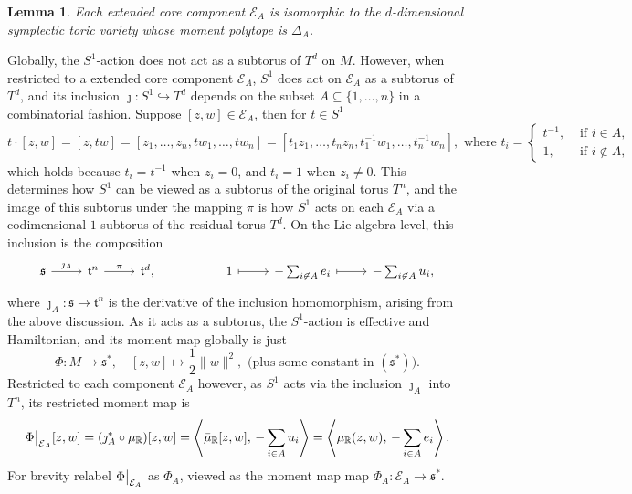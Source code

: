 \documentclass{amsart}
\newtheorem{lemma}[theorem]{Lemma}
\newcommand{\ra}{\rightarrow}
\newcommand{\RR}{\mathbb{R}}
\newcommand{\mcE}{\mathcal{E}}
\newcommand{\mft}{\mathfrak{t}}
\newcommand{\mf}[1]{\mathfrak{#1}}
\newcommand\restr[2]{{%
		\left.\kern-\nulldelimiterspace %
		#1 %
		\vphantom{\big|} %
		\right|_{#2} %
}}
\begin{document}
	\begin{lemma}
		Each extended core component $\mcE_{A}$ is isomorphic to the $d$-dimensional symplectic toric variety whose moment polytope is $\Delta_{A}$.
	\end{lemma}

	Globally, the $S^{1}$-action does not act as a subtorus of $T^{d}$ on $M$. However, when restricted to a extended core component $\mcE_{A}$, $S^{1}$ does act on $\mcE_{A}$ as a subtorus of $T^{d}$, and its inclusion $\jmath : S^{1} \hookrightarrow T^{d}$ depends on the subset $A \subseteq \{1, \ldots, n\}$ in a combinatorial fashion.
	Suppose $[z, w] \in \mcE_{A}$, then for $t \in S^{1}$
	\[
		t \cdot [z, w] = [z, tw] = [z_{1}, \ldots, z_{n}, tw_{1}, \ldots, tw_{n}] = [t_{1}z_{1}, \ldots, t_{n}z_{n}, t_{1}^{-1}w_{1}, \ldots, t_{n}^{-1}w_{n}], \text{ where } t_{i} =
		\begin{cases}
			t^{-1}, &\text{ if } i \in A, \\
			1, &\text{ if } i \not\in A,
		\end{cases}
	\]
	which holds because $t_{i} = t^{-1}$ when $z_{i} =0$, and $t_{i} = 1$ when $z_{i} \neq 0$.
	This determines how $S^{1}$ can be viewed as a subtorus of the original torus $T^{n}$, and the image of this subtorus under the mapping $\pi$ is how $S^{1}$ acts on each $\mcE_{A}$ via a codimensional-$1$ subtorus of the residual torus $T^{d}$. On the Lie algebra level, this inclusion is the composition
	\[
	\begin{tikzcd}[ampersand replacement=\&]
		\mf{s} \arrow[r, "\jmath_{A}"] \&
		\mft^{n} \arrow[r, "\pi"] \& \mft^{d}, \& \& 1 \arrow[r, mapsto] \& -\sum_{i \not\in A}e_{i} \arrow[r, mapsto] \& -\sum_{i \not\in A} u_{i},
	\end{tikzcd}
	\]
	where $\jmath_{A} : \mf{s} \ra \mft^{n}$ is the derivative of the inclusion homomorphism, arising from the above discussion. As it acts as a subtorus, the $S^{1}$-action is effective and Hamiltonian, and its moment map globally is just
	\[
		\Phi : M \ra \mf{s}^{\ast}, \quad [z,w] \mapsto \frac{1}{2}\|w\|^{2}, \text{ (plus some constant in } (\mf{s}^{\ast})\text{)}.
	\]
	Restricted to each component $\mcE_{A}$ however, as $S^{1}$ acts via the inclusion $\jmath_{A}$ into $T^{n}$, its restricted moment map is
	\[
		\restr{\Phi}{\mcE_{A}}[z,w] = (\jmath_{A}^{\ast} \circ \mu_{\RR})[z,w] = \left\langle \bar{\mu}_{\RR}[z,w], \, -\sum_{i \in A} u_{i} \right\rangle = \left\langle \mu_{\RR}(z,w), \, -\sum_{i \in A} e_{i} \right\rangle.
	\]
	For brevity relabel $\restr{\Phi}{\mcE_{A}}$ as $\Phi_{A}$, viewed as the moment map map $\Phi_{A} : \mcE_{A} \ra \mf{s}^{\ast}$.
	
\end{document}
